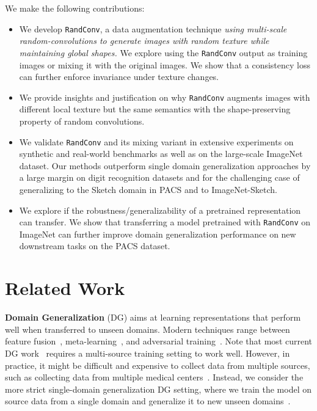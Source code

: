 \documentclass{article} \usepackage{iclr2021_conference,times}
\newcommand{\RandConv}{\texttt{RandConv}}
\begin{document}
We make the following contributions:
\begin{itemize}[leftmargin=2em]
	\vspace{-0mm}
	\setlength\itemsep{0em}
\item We develop {\RandConv}, a data augmentation technique \emph{using multi-scale random-convolutions to generate images with random texture while maintaining global shapes.} We explore using the {\RandConv} output as training images or mixing it with the original images. We show that a consistency loss can further enforce invariance under texture changes.
	\item We provide insights and justification on why {\RandConv} augments images with different local texture but the same semantics with the shape-preserving property of random convolutions.
	\item We validate {\RandConv} and its mixing variant in extensive experiments on synthetic and real-world benchmarks as well as on the large-scale ImageNet dataset. Our methods outperform single domain generalization approaches by a large margin on digit recognition datasets and for the challenging case of generalizing to the Sketch domain in PACS and to ImageNet-Sketch.
	\item  We explore if the robustness/generalizability of a pretrained representation can transfer. We show that transferring a model pretrained with {\RandConv} on ImageNet can further improve domain generalization performance on new downstream tasks on the PACS dataset.
\end{itemize}

\section{Related Work}
\textbf{Domain Generalization} (DG) aims at learning representations that perform well when transferred to unseen domains. Modern techniques range between feature fusion~\citep{shen2019situational}, meta-learning~\citep{li2018mldg, balaji2018metareg}, and adversarial training~\citep{shao2019multi, li2018domain}. Note that most current DG work~\citep{ghifary2016scatter, li2018mldg, li2018domain} requires a multi-source training setting to work well. However, in practice, it might be difficult and expensive to collect data from multiple sources, such as collecting data from multiple medical centers~\citep{raghupathi2014big}. 
Instead, we consider the more strict single-domain generalization DG setting, where we train the model on source data from a single domain and generalize it to new unseen domains~\citep{carlucci2019jigen, wang2018learning}.
\end{document}

